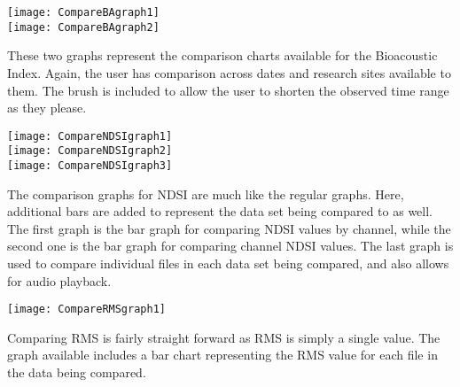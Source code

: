 \begin{center}
	\texttt{[image: CompareBAgraph1]} \\[12pt]
	\texttt{[image: CompareBAgraph2]} \\[12pt]
\end{center}

These two graphs represent the comparison charts available for the Bioacoustic Index. Again, the user has comparison across dates and research sites available to them. The brush is included to allow the user to shorten the observed time range as they please.\\

\begin{center}
	\texttt{[image: CompareNDSIgraph1]} \\[12pt]
	\texttt{[image: CompareNDSIgraph2]} \\[12pt]
	\texttt{[image: CompareNDSIgraph3]} \\[12pt]
\end{center}

The comparison graphs for NDSI are much like the regular graphs. Here, additional bars are added to represent the data set being compared to as well. The first graph is the bar graph for comparing NDSI values by channel, while the second one is the bar graph for comparing channel NDSI values. The last graph is used to compare individual files in each data set being compared, and also allows for audio playback.\\

\begin{center}
	\texttt{[image: CompareRMSgraph1]} \\[12pt]
\end{center}

Comparing RMS is fairly straight forward as RMS is simply a single value. The graph available includes a bar chart representing the RMS value for each file in the data being compared.

